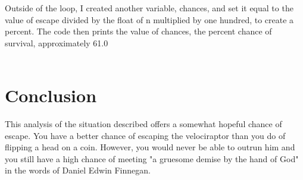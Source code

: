 \documentclass[twocolumn]{revtex4}
\begin{document}
Outside of the loop, I created another variable, chances, and set it equal to the value of escape divided by the float of n multiplied by one hundred, to create a percent. The code then prints the value of chances, the percent chance of survival, approximately 61.0%
\\
\\
\section{Conclusion}
This analysis of the situation described offers a somewhat hopeful chance of escape. You have a better chance of escaping the velociraptor than you do of flipping a head on a coin. However, you would never be able to outrun him and you still have a high chance of meeting "a gruesome demise by the hand of God" in the words of Daniel Edwin Finnegan.
\end{document}
